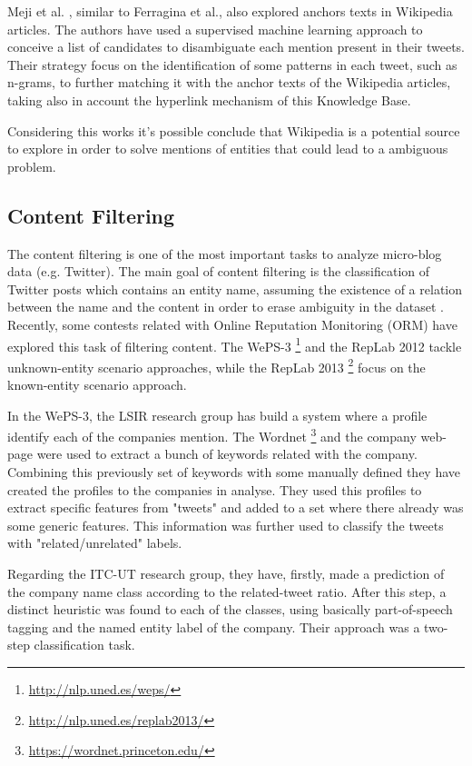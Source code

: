 Meji et al. \cite{kn:Meij2012}, similar to Ferragina et al., also explored anchors texts in Wikipedia articles. The authors have used a supervised machine learning approach to conceive a list of candidates to disambiguate each mention present in their tweets. Their strategy focus on the identification of some patterns in each tweet, such as n-grams, to further matching it with the anchor texts of the Wikipedia articles, taking also in account the hyperlink mechanism of this Knowledge Base.

Considering this works it's possible conclude that Wikipedia is a potential source to explore in order to solve mentions of entities that could lead to a ambiguous problem. 

\subsection{Content Filtering}
The content filtering is one of the most important tasks to analyze micro-blog data (e.g. Twitter). The main goal of content filtering is the classification of Twitter posts which contains an entity name, assuming the existence of a relation between the name and the content in order to erase ambiguity in the dataset \cite{kn:spina2014}. Recently, some contests related with Online Reputation Monitoring (ORM) have explored this task of filtering content. The WePS-3 \footnote{\url{http://nlp.uned.es/weps/}} and the RepLab 2012 tackle unknown-entity scenario approaches, while the RepLab 2013 \footnote{\url{http://nlp.uned.es/replab2013/}} focus on the known-entity scenario approach.

In the WePS-3, the LSIR \cite{kn:Yerva2010} research group has build a system where a profile identify each of the companies mention. The Wordnet \footnote{\url{https://wordnet.princeton.edu/}} and the company web-page were used to extract a bunch of keywords related with the company. Combining this previously set of keywords with some manually defined they have created the profiles to the companies in analyse. They used this profiles to extract specific features from "tweets" and added to a set where there already was some generic features. This information was further used to classify the tweets with "related/unrelated" labels.

Regarding the ITC-UT \cite{kn:Yoshida2010} research group, they have, firstly, made a prediction of the company name class according to the related-tweet ratio. After this step, a distinct heuristic was found to each of the classes, using basically part-of-speech tagging and the named entity label of the company. Their approach was a two-step classification task.

